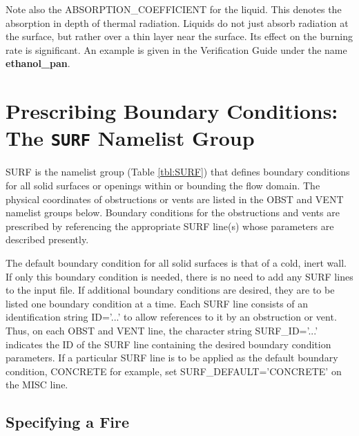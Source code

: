 \documentclass[11pt]{book}
\begin{document}
Note also the {\ct ABSORPTION\_COEFFICIENT} for the liquid. This denotes the absorption in depth of thermal radiation. Liquids do not
just absorb radiation at the surface, but rather over a thin layer near the surface. Its effect on the burning rate is
significant. An example is given in the Verification Guide under the name {\bf ethanol\_pan}.




\clearpage

\section{Prescribing Boundary Conditions: The \texorpdfstring{{\tt SURF}}{SURF} Namelist Group}
\label{info:SURF}

{\ct SURF} is the namelist group (Table \ref{tbl:SURF}) that defines
boundary conditions for all solid surfaces or openings within or
bounding the flow domain.  The physical coordinates of obstructions or
vents are listed in the {\ct OBST} and {\ct VENT} namelist groups
below. Boundary conditions for the obstructions and vents are
prescribed by referencing the appropriate {\ct SURF} line(s) whose
parameters are described presently.

The default boundary condition for all solid surfaces is that of a
cold, inert wall. If only this
boundary condition is needed, there is no need to add any {\ct SURF} lines
to the input file. If additional boundary conditions are desired,
they are to be listed one boundary condition at a time.
Each {\ct SURF} line consists of an identification string {\ct ID='...'} to
allow references to it by an obstruction or vent. Thus, on each
{\ct OBST} and {\ct VENT} line, the character string {\ct SURF\_ID='...'}
indicates the {\ct ID} of the {\ct SURF} line containing the desired boundary
condition parameters. If a particular {\ct SURF} line is to be applied
as the default boundary condition, {\ct CONCRETE} for example,
set {\ct SURF\_DEFAULT='CONCRETE'} on the {\ct MISC} line.


\subsection{Specifying a Fire}
\end{document}
